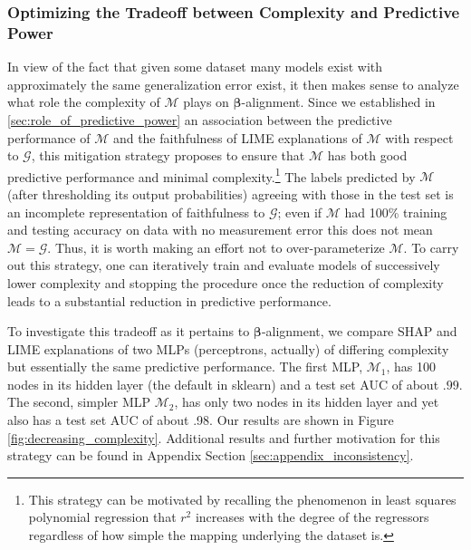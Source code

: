 \documentclass[mnsc,blindrev]{informs3}
\begin{document}
        \subsubsection{Optimizing the Tradeoff between Complexity and Predictive Power}
            \label{sec:decreasing_complexity}
            In view of the fact that given some dataset many models exist with approximately the same generalization error exist, it then makes sense to analyze what role the complexity of $\mathcal{M}$ plays on $\boldsymbol{\beta}$-alignment. Since we established in \ref{sec:role_of_predictive_power} an association between the predictive performance of $\mathcal{M}$ and the faithfulness of LIME explanations of $\mathcal{M}$ with respect to $\mathcal{G}$, this mitigation strategy proposes to ensure that $\mathcal{M}$ has both good predictive performance and minimal complexity.\footnote{This strategy can be motivated by recalling the phenomenon in least squares polynomial regression that $r^2$ increases with the degree of the regressors regardless of how simple the mapping underlying the dataset is.} The labels predicted by $\mathcal{M}$ (after thresholding its output probabilities) agreeing with those in the test set is an incomplete representation of faithfulness to $\mathcal{G}$; even if $\mathcal{M}$ had 100\% training and testing accuracy on data with no measurement error this does not mean $\mathcal{M}=\mathcal{G}$. Thus, it is worth making an effort not to over-parameterize $\mathcal{M}$. To carry out this strategy, one can iteratively train and evaluate models of successively lower complexity and stopping the procedure once the reduction of complexity leads to a substantial reduction in predictive performance. 
            
            To investigate this tradeoff as it pertains to $\boldsymbol{\beta}$-alignment, we compare SHAP and LIME explanations of two MLPs (perceptrons, actually) of differing complexity but essentially the same predictive performance. The first MLP, $\mathcal{M}_1$, has 100 nodes in its hidden layer (the default in sklearn) and a test set AUC of about $.99$. The second, simpler MLP $\mathcal{M}_2$, has only two nodes in its hidden layer and yet also has a test set AUC of about .98. Our results are shown in Figure \ref{fig:decreasing_complexity}. Additional results and further motivation for this strategy can be found in Appendix Section \ref{sec:appendix_inconsistency}.
\end{document}
